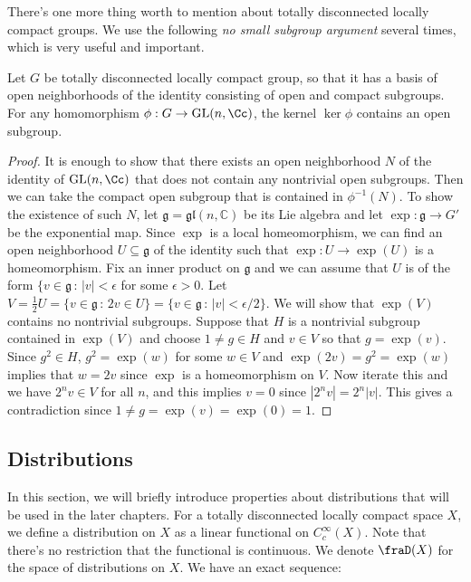 There's one more thing worth to mention about totally disconnected locally compact groups. We use the following \emph{no small subgroup argument} several times, which is very useful and important. 

\begin{proposition}
\label{nss}
Let $G$ be totally disconnected locally compact group, so that it has a basis of open neighborhoods of the identity consisting of open and compact subgroups. For any homomorphism $\phi:G \to \GL(n, \Cc)$, the kernel $\ker \phi$ contains an open subgroup. 
\end{proposition}
\begin{proof}
It is enough to show that there exists an open neighborhood $N$ of the identity of $\GL(n, \Cc)$ that does not contain any nontrivial open subgroups. Then we can take the compact open subgroup that is contained in $\phi^{-1}(N)$. 
To show the existence of such $N$, let $\mathfrak{g}= \mathfrak{gl}(n, \mathbb{C})$ be its Lie algebra and let $\exp : \mathfrak{g} \to G'$ be the exponential map. Since $\exp$ is a local homeomorphism, we can find an open neighborhood $U \subseteq \mathfrak{g}$ of the identity such that $\exp:U\to \exp(U)$ is a homeomorphism. 
Fix an inner product on $\mathfrak{g}$ and we can assume that $U$ is of the form $\{v\in \mathfrak{g}\,:\, |v| <\epsilon$ for some $\epsilon>0$. 
Let $V = \frac{1}{2} U = \{v\in \mathfrak{g}\,:\, 2v\in U\} = \{v\in \mathfrak{g}\,:\, |v| <\epsilon/2\}$. 
We will show that $\exp(V)$ contains no nontrivial subgroups. 
Suppose that $H$ is a nontrivial subgroup contained in  $\exp(V)$ and choose $1\neq g\in H$ and $v\in V$ so that $g = \exp(v)$.  Since $g^{2}\in H$, $g^{2} = \exp(w)$ for some $w\in V$ and $\exp(2v) = g^{2} = \exp(w)$ implies that $w = 2v$ since $\exp$ is a homeomorphism on $V$. 
Now iterate this and we have $2^{n}v\in V$ for all $n$, and this implies $v = 0$ since $|2^{n}v| = 2^{n}|v|$. This gives a contradiction since $1\neq g = \exp(v) = \exp(0) = 1$. 
\end{proof}

\subsection{Distributions}

In this section, we will briefly introduce properties about distributions that will be used in the later chapters. For a totally disconnected locally compact space $X$, we define a distribution on $X$ as a linear functional on $C_{c}^{\infty}(X)$. Note that there's no restriction that the functional is continuous. 
We denote $\fraD(X)$ for the space of distributions on $X$. 
We have an exact sequence:

